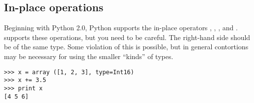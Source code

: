 \subsection{In-place operations}
\label{sec:inplace-operations}

Beginning with Python 2.0, Python supports the in-place operators
\index{+=}\code{+=}, \index{+=}\code{-=}, \index{*=}\code{*=}, and
\index{/=}\code{/=}. \Numarray{} supports these operations, but you need to be
careful. The right-hand side should be of the same type. Some violation of this
is possible, but in general contortions may be necessary for using the smaller
``kinds'' of types.
\begin{verbatim}
>>> x = array ([1, 2, 3], type=Int16)
>>> x += 3.5
>>> print x
[4 5 6]
\end{verbatim}


